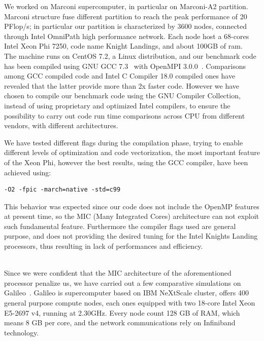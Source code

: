 We worked on Marconi\cite{marconi:specs} supercomputer, in particular on Marconi-A2 partition.
Marconi structure fuse different partition to reach the peak performance of 20 PFlop/s; in particular our partition is characterized by 3600 nodes, connected through Intel OmniPath\cite{intel:intelmpivsopenmpi} high performance network. Each node host a 68-cores Intel Xeon Phi 7250, code name Knight Landings, and about 100GB of ram. \\
The machine runs on CentOS 7.2, a Linux distribution, and our benchmark code has been compiled using GNU GCC 7.3~\cite{gcc} with OpenMPI 3.0.0~\cite{openmpi}\cite{MPI:standard3}. Comparisons among GCC compiled code and Intel C Compiler 18.0 compiled ones have revealed that the latter provide more than 2x faster code. However we have chosen to compile our benchmark code using the GNU Compiler Collection, instead of using proprietary and optimized Intel compilers, to ensure the possibility to carry out code run time comparisons across CPU from different vendors, with different architectures. 
\par
We have tested different flags during the compilation phase, trying to enable different levels of optimization and code vectorization, the most important feature of the Xeon Phi, however the best results, using the GCC compiler, have been achieved using:
\begin{lstlisting}
-O2 -fpic -march=native -std=c99
\end{lstlisting}
This behavior was expected since our code does not include the OpenMP\cite{openmp} features at present time, so the MIC\cite{mic} (Many Integrated Cores) architecture can not exploit such fundamental feature. Furthermore the compiler flags used are general purpose, and does not providing the desired tuning for the Intel Knights Landing processors, thus resulting in lack of performances and efficiency.\\~\par
Since we were confident that the MIC architecture of the aforementioned processor penalize us, we have carried out a few comparative simulations on Galileo~\cite{galileo:specs}.
Galileo is supercomputer based on IBM NeXtScale cluster, offers 400 general purpose compute nodes, each ones equipped with two 18-core Intel Xeon E5-2697 v4, running at 2.30GHz. Every node count 128 GB of RAM, which means 8 GB per core, and the network communications rely on Infiniband technology.

